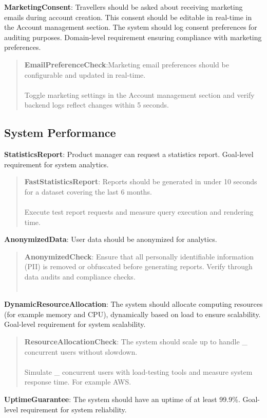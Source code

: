 \textbf{MarketingConsent}: Travellers should be asked about receiving marketing emails during account creation. This consent should be editable in real-time in the Account management section. The system should log consent preferences for auditing purposes. Domain-level requirement ensuring compliance with marketing preferences.
\begin{quote}
    \textbf{EmailPreferenceCheck}:Marketing email preferences should be configurable and updated in real-time. \\ \\ 
    Toggle marketing settings in the Account management section and verify backend logs reflect changes within 5 seconds.
\end{quote}

\subsection{System Performance}
\textbf{StatisticsReport}: Product manager can request a statistics report. Goal-level requirement for system analytics.
\begin{quote}
    \textbf{FastStatisticsReport}: Reports should be generated in under 10 seconds for a dataset covering the last 6 months. \\ \\
    Execute test report requests and measure query execution and rendering time.
\end{quote}
\textbf{AnonymizedData}: User data should be anonymized for analytics. 
\begin{quote}
    \textbf{AnonymizedCheck}: Ensure that all personally identifiable information (PII) is removed or obfuscated before generating reports. Verify through data audits and compliance checks. \\ \\
\end{quote}
\textbf{DynamicResourceAllocation}: The system should allocate computing resources (for example memory and CPU), dynamically based on load to ensure scalability. Goal-level requirement for system scalability.
\begin{quote}
    \textbf{ResourceAllocationCheck}: The system should scale up to handle \_ concurrent users without slowdown. \\ \\
    Simulate \_ concurrent users with load-testing tools and measure system response time. For example AWS.
\end{quote}
\textbf{UptimeGuarantee}: The system should have an uptime of at least 99.9\%. Goal-level requirement for system reliability.
